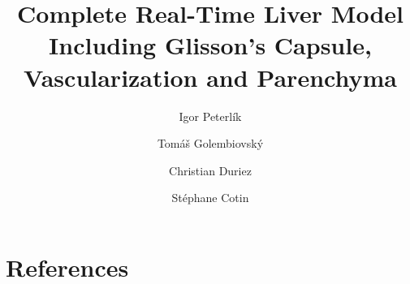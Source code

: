 \documentclass[final,times,twocolumn,3p]{elsarticle}
\title{Complete Real-Time Liver Model Including Glisson's Capsule, Vascularization and Parenchyma}
\author[IHU]{Igor Peterl\'ik}
\author[Masaryk]{Tom\'a\v{s} Golembiovsk\'y}
\author[Inria]{Christian Duriez}
\author[Inria]{St\'ephane Cotin}
\begin{document}
%
%
%
%
%
%
%
%
%
%
%
\section{References}%
%

%
%
%
%
\end{document}
